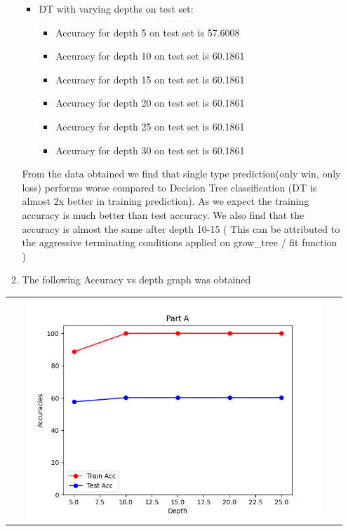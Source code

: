 \begin{enumerate}[label=(\alph*)]
\begin{enumerate}[label=\roman*.]
\begin{itemize}
                        \item DT with varying depths on test set:
                              \begin{itemize}
                                  \item Accuracy for depth 5 on test set is 57.6008
                                  \item Accuracy for depth 10 on test set is 60.1861
                                  \item Accuracy for depth 15 on test set is 60.1861
                                  \item Accuracy for depth 20 on test set is 60.1861
                                  \item Accuracy for depth 25 on test set is 60.1861
                                  \item Accuracy for depth 30 on test set is 60.1861
                              \end{itemize}
                    \end{itemize}
                    From the data obtained we find that single type prediction(only win, only loss) performs worse compared to Decision Tree classification (DT is almost 2x better in training prediction). As we expect the training accuracy is much better than test accuracy. We also find that the accuracy is almost the same after depth 10-15 ( This can be attributed to the aggressive terminating conditions applied on grow\_tree / fit function )
              \item The following Accuracy vs depth graph was obtained
          \end{enumerate}
          \begin{center}
              \begin{tabular}{c}
                  \includegraphics[width=0.9\textwidth]{./images/q1_part_a.png}
              \end{tabular}
          \end{center}


\end{enumerate}
